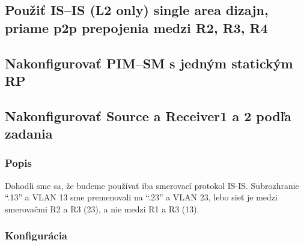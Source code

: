 \documentclass[12pt,twoside,a4paper]{report}
\begin{document}
\subsection{Použiť IS–IS (L2 only) single area dizajn, priame p2p prepojenia medzi R2, R3, R4}
\subsection{Nakonfigurovať PIM–SM s jedným statickým RP}
\subsection{Nakonfigurovať Source a Receiver1 a 2 podľa zadania}
\subsubsection{Popis}
Dohodli sme sa, že budeme používať iba smerovací protokol IS-IS.
Subrozhranie “.13” a VLAN 13 sme premenovali na “.23” a VLAN 23, lebo sieť je medzi smerovačmi R2 a R3 (23), a nie medzi R1 a R3 (13).


\subsubsection{Konfigurácia}
\end{document}
